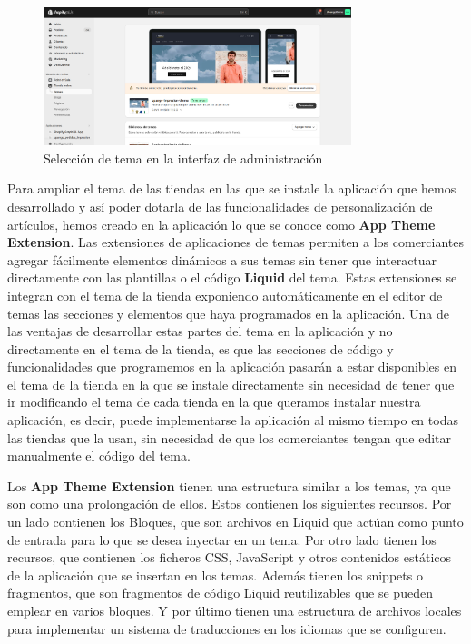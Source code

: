 \documentclass[12pt]{article}
\begin{document}
\begin{figure}[ht]
    \centering
    \includegraphics[width=0.8\textwidth]{imagenes/Interfaz de adminsitración elección de tema.png}
    \caption{\label{fig:2}Selección de tema en la interfaz de administración}
    \vspace{\fill}
\end{figure}

Para ampliar el tema de las tiendas en las que se instale la aplicación que hemos desarrollado y así poder dotarla de las funcionalidades de personalización de 
artículos, hemos creado en la aplicación lo que se conoce como \textbf{App Theme Extension}. Las extensiones de aplicaciones de temas permiten a los comerciantes
agregar fácilmente elementos dinámicos a sus temas sin tener que interactuar directamente con las plantillas o el código \textbf{Liquid} del tema. Estas extensiones
se integran con el tema de la tienda exponiendo automáticamente en el editor de temas las secciones y elementos que haya programados en la aplicación. \cite{shopify-dev}
Una de las ventajas de desarrollar estas partes del tema en la aplicación y no directamente en el tema de la tienda, es que las secciones de código y funcionalidades
que programemos en la aplicación pasarán a estar disponibles en el tema de la tienda en la que se instale directamente sin necesidad de tener que ir modificando el tema
de cada tienda en la que queramos instalar nuestra aplicación, es decir, puede implementarse la aplicación al mismo tiempo en todas las tiendas que la usan,
sin necesidad de que los comerciantes tengan que editar manualmente el código del tema.

Los \textbf{App Theme Extension} tienen una estructura similar a los temas, ya que son como una prolongación de ellos. Estos contienen los siguientes recursos. 
Por un lado contienen los Bloques, que son archivos en Liquid que actúan como punto de entrada para lo que se desea inyectar en un tema. Por otro lado
tienen los recursos, que contienen los ficheros CSS, JavaScript y otros contenidos estáticos de la aplicación que se insertan en los temas. Además tienen
los snippets o fragmentos, que son fragmentos de código Liquid reutilizables que se pueden emplear en varios bloques. Y por último tienen una estructura de archivos locales
para implementar un sistema de traducciones en los idiomas que se configuren. \cite{shopify-dev}
\end{document}
